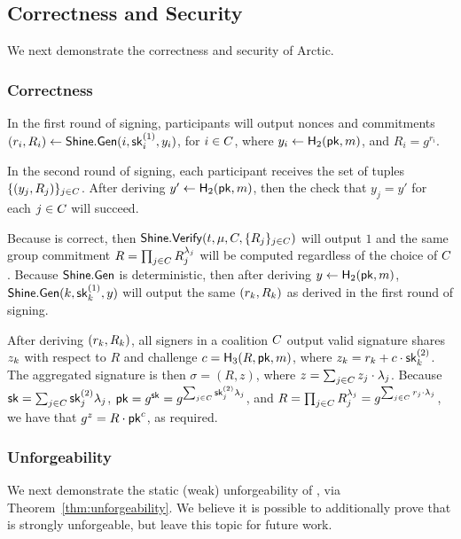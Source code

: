 \subsection{Correctness and Security}
\label{arctic-security}

We next demonstrate the correctness and security of Arctic.

\subsubsection{Correctness}
In the first round of signing,
participants will output nonces and commitments
$(r_i, R_i) \gets \mathsf{Shine}.\mathsf{Gen}(i, \mathsf{sk}^{(1)}_i, y_i)$,
for $i \in C$,
where $y_i \gets \mathsf{H}_2(\mathsf{pk}, m)$,
and $R_i = g^{r_i}$.

In the second round of signing,
each participant receives the set of tuples $\{(y_j, R_j) \}_{j \in C}$.
After deriving $y' \gets \mathsf{H}_2(\mathsf{pk}, m)$,
then the check that $y_j = y'$ for each $j \in C$ will succeed.

Because \DVRFOne is correct,
then
$\mathsf{Shine}.\mathsf{Verify}(t, \mu, C, \{R_j\}_{j \in C})$ will output $1$
and the same group commitment $R = \prod_{j \in C} R_j^{\lambda_j}$ will be computed regardless of the choice of $C$.
Because $\mathsf{Shine}.\mathsf{Gen}$ is deterministic,
then after deriving $y \gets \mathsf{H}_2(\mathsf{pk}, m)$,
$\mathsf{Shine}.\mathsf{Gen}(k, \allowbreak \mathsf{sk}^{(1)}_k, y)$
will output the same $(r_k, R_k)$ as derived in the first round of signing.


After deriving $(r_k, R_k)$,
all signers in a coalition $C$ output valid signature shares $z_k$
with respect to $R$
and challenge $c = \mathsf{H}_3(R, \mathsf{pk}, m)$,
where $z_k =  r_k + c \cdot \mathsf{sk}^{(2)}_k$.
The aggregated signature is then $\sigma = (R, z)$,
where $z = \sum_{j \in C} z_j \cdot \lambda_j$.
Because $\mathsf{sk} = \sum_{j \in C} \mathsf{sk}^{(2)}_j \lambda_j$,
$\mathsf{pk} = g^{\mathsf{sk}} = g^{\sum_{j \in C} \mathsf{sk}^{(2)}_j \lambda_j}$,
and $R = \prod_{j \in C} R_j^{\lambda_j} = g^{\sum_{j \in C} r_j\cdot \lambda_j}$,
we have that $g^z = R \cdot \mathsf{pk}^c$, as required.



\subsubsection{Unforgeability}
We next demonstrate the static (weak) unforgeability of \glitter,
via Theorem~\ref{thm:unforgeability}.
We believe it is possible to additionally prove that \glitter is strongly unforgeable,
but leave this topic for future work.

